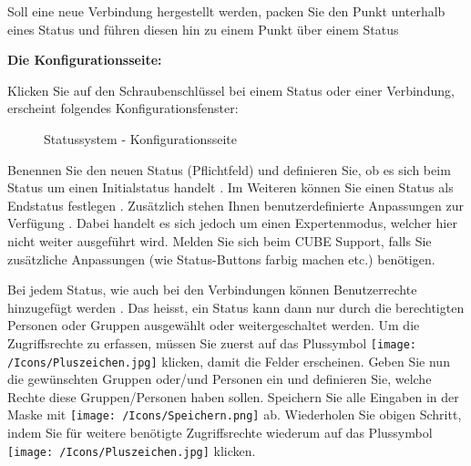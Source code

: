 \vspace{\baselineskip}

Soll eine neue Verbindung hergestellt werden, packen Sie den Punkt unterhalb eines Status  und führen diesen hin zu einem Punkt über einem Status 

\vspace{\baselineskip}

\pagebreak
\textbf{Die Konfigurationsseite:}

\vspace{\baselineskip}

Klicken Sie auf den Schraubenschlüssel  bei einem Status oder einer Verbindung, erscheint folgendes Konfigurationsfenster:

\begin{figure}[H]
\caption{Statussystem - Konfigurationsseite}
\end{figure}

Benennen Sie den neuen Status  (Pflichtfeld) und definieren Sie, ob es sich beim Status um einen Initialstatus handelt . Im Weiteren können Sie einen Status als Endstatus festlegen . Zusätzlich stehen Ihnen benutzerdefinierte Anpassungen zur Verfügung . Dabei handelt es sich jedoch um einen Expertenmodus, welcher hier nicht weiter ausgeführt wird. Melden Sie sich beim CUBE Support, falls Sie zusätzliche Anpassungen (wie Status-Buttons farbig machen etc.) benötigen.

\vspace{\baselineskip}

Bei jedem Status, wie auch bei den Verbindungen können Benutzerrechte hinzugefügt werden . Das heisst, ein Status kann dann nur durch die berechtigten Personen oder Gruppen ausgewählt oder weitergeschaltet werden. Um die Zugriffsrechte zu erfassen, müssen Sie zuerst auf das Plussymbol \texttt{[image: /Icons/Pluszeichen.jpg]}  klicken, damit die Felder erscheinen. Geben Sie nun die gewünschten Gruppen oder/und Personen ein und definieren Sie, welche Rechte diese Gruppen/Personen haben sollen. Speichern Sie alle Eingaben in der Maske mit \texttt{[image: /Icons/Speichern.png]}  ab. Wiederholen Sie obigen Schritt, indem Sie für weitere benötigte Zugriffsrechte wiederum auf das Plussymbol \texttt{[image: /Icons/Pluszeichen.jpg]}  klicken.